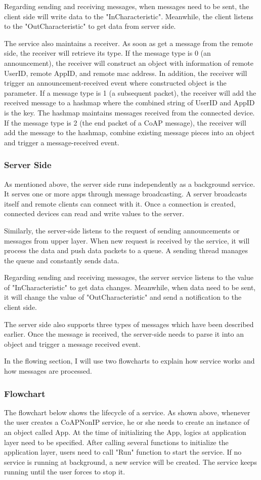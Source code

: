 \documentclass{Nan_Thesis}
\begin{document}
Regarding sending and receiving messages, when messages need to be sent, the client side will write data to the "InCharacteristic". Meanwhile, the client listens to the "OutCharacteristic" to get data from server side.

The service also maintains a receiver. As soon as get a message from the remote side, the receiver will retrieve its type. If the message type is 0 (an announcement), the receiver will construct an object with information of remote UserID, remote AppID, and remote mac address. In addition, the receiver will trigger an announcement-received event where constructed object is the parameter. If a message type is 1 (a subsequent packet), the receiver will add the received message to a hashmap where the combined string of UserID and AppID is the key. The hashmap maintains messages received from the connected device. If the message type is 2 (the end packet of a CoAP message), the receiver will add the message to the hashmap, combine existing message pieces into an object and trigger a message-received event.  
\subsubsection{Server Side}
As mentioned above, the server side runs independently as a background service. It serves one or more apps through message broadcasting. A server broadcasts itself and remote clients can connect with it. Once a connection is created, connected devices can read and write values to the server. 

Similarly, the server-side listens to the request of sending announcements or messages from upper layer. When new request is received by the service, it will process the data and push data packets to a queue. A sending thread manages the queue and constantly sends data. 

Regarding sending and receiving messages, the server service listens to the value of "InCharacteristic" to get data changes. Meanwhile, when data need to be sent, it will change the value of "OutCharacteristic" and send a notification to the client side. 

The server side also supports three types of messages which have been described earlier. Once the message is received, the server-side needs to parse it into an object and trigger a message received event.

In the flowing section, I will use two flowcharts to explain how service works and how messages are processed. 
\subsubsection{Flowchart}
The flowchart below shows the lifecycle of a service. As shown above, whenever the user creates a CoAPNonIP service, he or she needs to create an instance of an object called App. At the time of initializing the App, logics at application layer need to be specified. After calling several functions to initialize the application layer, users need to call "Run" function to start the service. If no service is running at background, a new service will be created. The service keeps running until the user forces to stop it.
\end{document}
